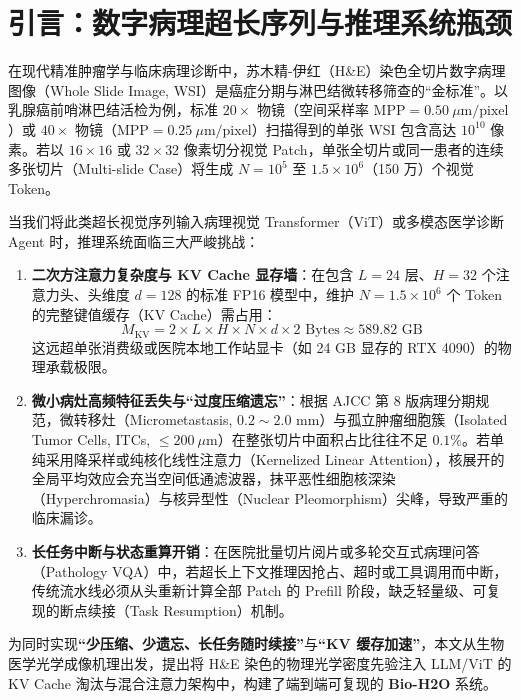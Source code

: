 \documentclass[10pt,twocolumn,a4paper]{ctexart}
\begin{document}
\section{引言：数字病理超长序列与推理系统瓶颈}

在现代精准肿瘤学与临床病理诊断中，苏木精-伊红（H\&E）染色全切片数字病理图像（Whole Slide Image, WSI）是癌症分期与淋巴结微转移筛查的“金标准”。以乳腺癌前哨淋巴结活检为例，标准 $20\times$ 物镜（空间采样率 $\text{MPP} = 0.50\ \mu\text{m/pixel}$）或 $40\times$ 物镜（$\text{MPP} = 0.25\ \mu\text{m/pixel}$）扫描得到的单张 WSI 包含高达 $10^{10}$ 像素。若以 $16 \times 16$ 或 $32 \times 32$ 像素切分视觉 Patch，单张全切片或同一患者的连续多张切片（Multi-slide Case）将生成 $N = 10^5$ 至 $1.5 \times 10^6$（150 万）个视觉 Token。

当我们将此类超长视觉序列输入病理视觉 Transformer（ViT）或多模态医学诊断 Agent 时，推理系统面临三大严峻挑战：
\begin{enumerate}
    \item \textbf{二次方注意力复杂度与 KV Cache 显存墙}：在包含 $L=24$ 层、$H=32$ 个注意力头、头维度 $d=128$ 的标准 FP16 模型中，维护 $N = 1.5 \times 10^6$ 个 Token 的完整键值缓存（KV Cache）需占用：
    \begin{equation}
        M_{\text{KV}} = 2 \times L \times H \times N \times d \times 2\text{ Bytes} \approx 589.82\text{ GB}
    \end{equation}
    这远超单张消费级或医院本地工作站显卡（如 24 GB 显存的 RTX 4090）的物理承载极限。
    \item \textbf{微小病灶高频特征丢失与“过度压缩遗忘”}：根据 AJCC 第 8 版病理分期规范，微转移灶（Micrometastasis, $0.2\sim 2.0\text{ mm}$）与孤立肿瘤细胞簇（Isolated Tumor Cells, ITCs, $\le 200\ \mu\text{m}$）在整张切片中面积占比往往不足 $0.1\%$。若单纯采用降采样或纯核化线性注意力（Kernelized Linear Attention），核展开的全局平均效应会充当空间低通滤波器，抹平恶性细胞核深染（Hyperchromasia）与核异型性（Nuclear Pleomorphism）尖峰，导致严重的临床漏诊。
    \item \textbf{长任务中断与状态重算开销}：在医院批量切片阅片或多轮交互式病理问答（Pathology VQA）中，若超长上下文推理因抢占、超时或工具调用而中断，传统流水线必须从头重新计算全部 Patch 的 Prefill 阶段，缺乏轻量级、可复现的断点续接（Task Resumption）机制。
\end{enumerate}

为同时实现\textbf{“少压缩、少遗忘、长任务随时续接”}与\textbf{“KV 缓存加速”}，本文从生物医学光学成像机理出发，提出将 H\&E 染色的物理光学密度先验注入 LLM/ViT 的 KV Cache 淘汰与混合注意力架构中，构建了端到端可复现的 \textbf{Bio-H2O} 系统。
\end{document}
